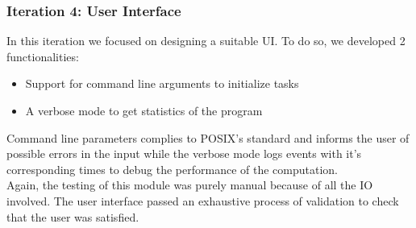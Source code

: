       \subsubsection{Iteration 4: User Interface}

      In this iteration we focused on designing a suitable UI. To do so, we
      developed 2 functionalities:
      \begin{itemize}
        \item Support for command line arguments to initialize tasks
        \item A verbose mode to get statistics of the program
      \end{itemize}

      Command line parameters complies to POSIX's standard and informs the
      user of possible errors in the input while the verbose mode logs events
      with it's corresponding times to debug the performance of the
      computation.\\

      Again, the testing of this module was purely manual because of all
      the IO involved. The user interface passed an exhaustive process of
      validation to check that the user was satisfied.\\
